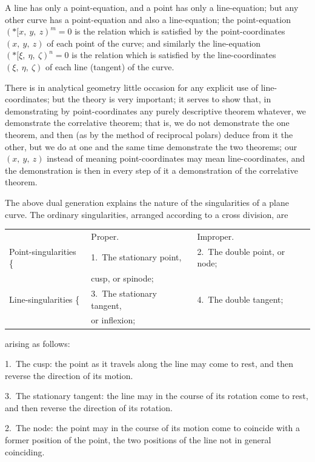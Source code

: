 \documentclass[12pt,a4paper,oneside]{book}
\begin{document}
A line has only a point-equation, and a point has only a line-equation; but any other curve has a point-equation and also a line-equation; the point-equation $(*\!\![ x,\ y,\ z)^{m}=0$ is the relation which is satisfied by the point-coordinates $(x,\ y,\ z)$ of each point of the curve; and similarly the line-equation $(*\!\![ \xi,\ \eta,\ \zeta)^{n}=0$ is the relation which is satisfied by the line-coordinates $(\xi,\ \eta,\ \zeta)$ of each line (tangent) of the curve.

There is in analytical geometry little occasion for any explicit use of line-coordinates; but the theory is very important; it serves to show that, in demonstrating by point-coordinates any purely descriptive theorem whatever, we demonstrate the correlative theorem; that is, we do not demonstrate the one theorem, and then (as by the method of reciprocal polars) deduce from it the other, but we do at one and the same time demonstrate the two theorems; our $(x,\ y,\ z)$ instead of meaning point-coordinates may mean line-coordinates, and the demonstration is then in every step of it a demonstration of the correlative theorem.

The above dual generation explains the nature of the singularities of a plane curve. The ordinary singularities, arranged according to a cross division, are
\begin{center}
\begin{tabular}{lll}
                       & Proper.                                  & Improper. \\
Point-singularities \{ & 1.~The stationary point,                 & 2.~The double point, or node; \\
                       & \quad cusp, or spinode;                  & \\
Line-singularities  \{ & 3.~The stationary tangent,               & 4.~The double tangent; \\
                       & \quad or inflexion;                      &
\end{tabular}
\end{center}
arising as follows:

1.~The cusp: the point as it travels along the line may come to rest, and then reverse the direction of its motion.

3.~The stationary tangent: the line may in the course of its rotation come to rest, and then reverse the direction of its rotation.

2.~The node: the point may in the course of its motion come to coincide with a former position of the point, the two positions of the line not in general coinciding.
\end{document}
